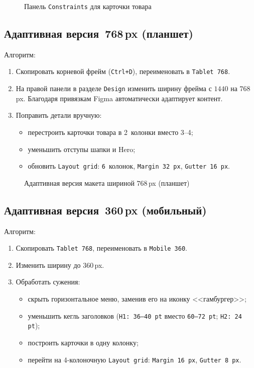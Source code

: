 \begin{figure}[h]
  \centering
  \caption{Панель \texttt{Constraints} для карточки товара}
  \label{fig:constraints}
\end{figure}

\subsection{Адаптивная версия~768\,px (планшет)}

Алгоритм:
\begin{enumerate}
  \item Скопировать корневой фрейм (\texttt{Ctrl+D}),
        переименовать в \texttt{Tablet~768}.
  \item На правой панели в разделе \texttt{Design} изменить ширину
        фрейма с \(1440\) на \(768\,\)px. Благодаря привязкам Figma
        автоматически адаптирует контент.
  \item Поправить детали вручную:
  \begin{itemize}
    \item перестроить карточки товара в 2~колонки вместо 3--4;
    \item уменьшить отступы шапки и Hero;
    \item обновить \texttt{Layout grid}: \texttt{6}~колонок,
          \texttt{Margin~32\,px}, \texttt{Gutter~16\,px}.
  \end{itemize}
\end{enumerate}

\begin{figure}[h]
  \centering
  \caption{Адаптивная версия макета шириной \(768\,\)px (планшет)}
  \label{fig:tablet}
\end{figure}

\subsection{Адаптивная версия~360\,px (мобильный)}

Алгоритм:
\begin{enumerate}
  \item Скопировать \texttt{Tablet~768}, переименовать в
        \texttt{Mobile~360}.
  \item Изменить ширину до \(360\,\)px.
  \item Обработать сужения:
  \begin{itemize}
    \item скрыть горизонтальное меню, заменив его на иконку
          <<гамбургер>>;
    \item уменьшить кегль заголовков (\texttt{H1: 36--40\,pt} вместо
          \texttt{60--72\,pt}; \texttt{H2: 24\,pt});
    \item построить карточки в одну колонку;
    \item перейти на 4-колоночную \texttt{Layout grid}: \texttt{Margin
          16\,px}, \texttt{Gutter 8\,px}.
  \end{itemize}
\end{enumerate}


